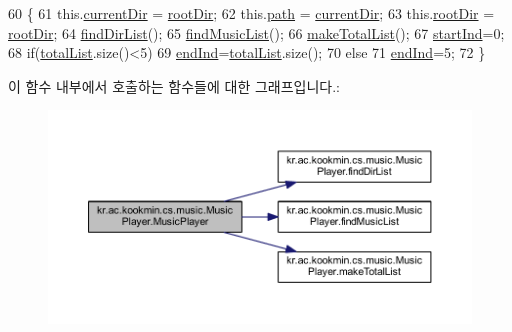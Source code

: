 \begin{DoxyCode}
60                                      \{
61     this.\hyperlink{classkr_1_1ac_1_1kookmin_1_1cs_1_1music_1_1_music_player_a2614e5b1bf00c55b57e08354bcb6be19}{currentDir} = \hyperlink{classkr_1_1ac_1_1kookmin_1_1cs_1_1music_1_1_music_player_a38c60f5f214d244f8da3ba7287d29a39}{rootDir};
62     this.\hyperlink{classkr_1_1ac_1_1kookmin_1_1cs_1_1music_1_1_music_player_ae9763f1d531b65e0be29470b24704f4f}{path} = \hyperlink{classkr_1_1ac_1_1kookmin_1_1cs_1_1music_1_1_music_player_a2614e5b1bf00c55b57e08354bcb6be19}{currentDir};
63     this.\hyperlink{classkr_1_1ac_1_1kookmin_1_1cs_1_1music_1_1_music_player_a38c60f5f214d244f8da3ba7287d29a39}{rootDir} = \hyperlink{classkr_1_1ac_1_1kookmin_1_1cs_1_1music_1_1_music_player_a38c60f5f214d244f8da3ba7287d29a39}{rootDir};
64     \hyperlink{classkr_1_1ac_1_1kookmin_1_1cs_1_1music_1_1_music_player_a449b2c9816ef1a55f8113b7155000d97}{findDirList}();
65     \hyperlink{classkr_1_1ac_1_1kookmin_1_1cs_1_1music_1_1_music_player_a51155c43158965823b24d0f69987be47}{findMusicList}();
66     \hyperlink{classkr_1_1ac_1_1kookmin_1_1cs_1_1music_1_1_music_player_ae4d53ac419495684317e05ae42885e8a}{makeTotalList}();
67     \hyperlink{classkr_1_1ac_1_1kookmin_1_1cs_1_1music_1_1_music_player_af154b8f09fc298427ccfb1d0e7c94447}{startInd}=0;
68     \textcolor{keywordflow}{if}(\hyperlink{classkr_1_1ac_1_1kookmin_1_1cs_1_1music_1_1_music_player_ac7599b9b64999c9fcb1b7f1e6d32d188}{totalList}.size()<5)
69       \hyperlink{classkr_1_1ac_1_1kookmin_1_1cs_1_1music_1_1_music_player_ad162359e29d80d26914c27b6318901eb}{endInd}=\hyperlink{classkr_1_1ac_1_1kookmin_1_1cs_1_1music_1_1_music_player_ac7599b9b64999c9fcb1b7f1e6d32d188}{totalList}.size();
70     \textcolor{keywordflow}{else}
71       \hyperlink{classkr_1_1ac_1_1kookmin_1_1cs_1_1music_1_1_music_player_ad162359e29d80d26914c27b6318901eb}{endInd}=5;
72   \}
\end{DoxyCode}


이 함수 내부에서 호출하는 함수들에 대한 그래프입니다.\+:\nopagebreak
\begin{figure}[H]
\begin{center}
\leavevmode
\includegraphics[width=350pt]{classkr_1_1ac_1_1kookmin_1_1cs_1_1music_1_1_music_player_a4eada02529f380a25164797ea5fa778e_cgraph}
\end{center}
\end{figure}




